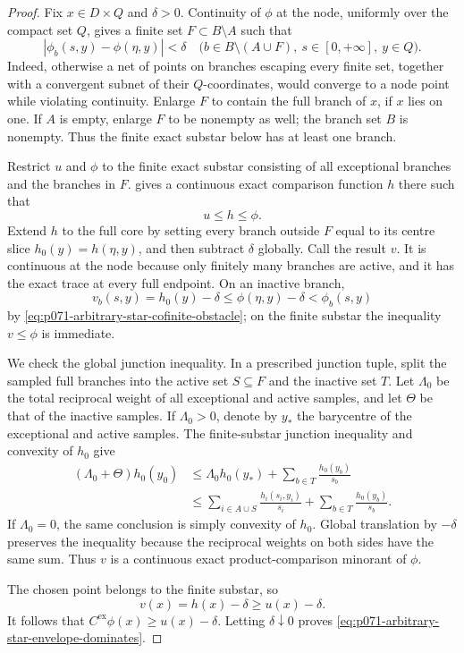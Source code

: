 \begin{proof}
Fix \(x\in D\times Q\) and \(\delta>0\).  Continuity of \(\phi\) at the
node, uniformly over the compact set \(Q\), gives a finite set
\(F\subset B\setminus A\) such that
\begin{equation}
 |\phi_b(s,y)-\phi(\eta,y)|<\delta
 \quad
 \bigl(b\in B\setminus(A\cup F),\
       s\in[0,+\infty],\ y\in Q\bigr).
 \label{eq:p071-arbitrary-star-cofinite-obstacle}
\end{equation}
Indeed, otherwise a net of points on branches escaping every finite set,
together with a convergent subnet of their \(Q\)-coordinates, would
converge to a node point while violating continuity.  Enlarge \(F\) to
contain the full branch of \(x\), if \(x\) lies on one.  If \(A\) is empty,
enlarge \(F\) to be nonempty as well; the branch set \(B\) is nonempty.
Thus the finite exact substar below has at least one branch.

Restrict \(u\) and \(\phi\) to the finite exact substar consisting of all
exceptional branches and the branches in \(F\).
 gives a continuous
exact comparison function \(h\) there such that
\[
                              u\leq h\leq\phi.
\]
Extend \(h\) to the full core by setting every branch outside \(F\) equal
to its centre slice \(h_0(y)=h(\eta,y)\), and then subtract \(\delta\)
globally.  Call the result \(v\).  It is continuous at the node because
only finitely many branches are active, and it has the exact trace at every
full endpoint.  On an inactive branch,
\[
 v_b(s,y)=h_0(y)-\delta
       \leq\phi(\eta,y)-\delta
       <\phi_b(s,y)
\]
by \eqref{eq:p071-arbitrary-star-cofinite-obstacle}; on the finite substar
the inequality \(v\leq\phi\) is immediate.

We check the global junction inequality.  In a prescribed junction tuple,
split the sampled full branches into the active set \(S\subseteq F\) and
the inactive set \(T\).  Let \(\Lambda_0\) be the total reciprocal weight
of all exceptional and active samples, and let \(\Theta\) be that of the
inactive samples.  If \(\Lambda_0>0\), denote by \(y_*\) the barycentre of
the exceptional and active samples.  The finite-substar junction inequality
and convexity of \(h_0\) give
\[
 \begin{split}
  (\Lambda_0+\Theta)h_0(y_0)
  &\leq \Lambda_0h_0(y_*)
       +\sum_{b\in T}\frac{h_0(y_b)}{s_b}\\
  &\leq
       \sum_{i\in A\cup S}\frac{h_i(s_i,y_i)}{s_i}
       +\sum_{b\in T}\frac{h_0(y_b)}{s_b}.
 \end{split}
\]
If \(\Lambda_0=0\), the same conclusion is simply convexity of \(h_0\).
Global translation by \(-\delta\) preserves the inequality because the
reciprocal weights on both sides have the same sum.  Thus \(v\) is a
continuous exact product-comparison minorant of \(\phi\).

The chosen point belongs to the finite substar, so
\[
                         v(x)=h(x)-\delta\geq u(x)-\delta.
\]
It follows that
\(C^{\mathrm{ex}}\phi(x)\geq u(x)-\delta\).  Letting \(\delta\downarrow0\)
proves \eqref{eq:p071-arbitrary-star-envelope-dominates}.
\end{proof}
